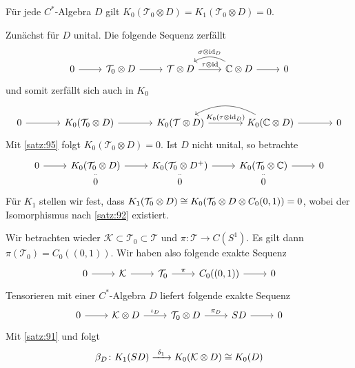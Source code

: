 \begin{korollar}[label=korr:96]
	Für jede $C^*$-Algebra $D$ gilt $K_0(\mathcal{T}_0 \otimes D) = K_1(\mathcal{T}_0 \otimes D) = 0$.
\end{korollar}
\begin{beweis}
	Zunächst für $D$ unital.
	Die folgende Sequenz zerfällt
	\[
		\begin{tikzcd}
			0 \rar & \mathcal{T}_0 \otimes D \rar & \mathcal{T} \otimes D \rar["\tau \otimes {\id}"] & \mathbb{C} \otimes D \rar \lar[bend right,"\sigma \otimes {\id_D}"'] & 0
		\end{tikzcd}
	\]
	und somit zerfällt sich auch in $K_0$
	\[
		\begin{tikzcd}[sep=large]
			0 \rar & K_0(\mathcal{T}_0 \otimes D) \rar & K_0(\mathcal{T} \otimes D) \rar["K_0(\tau \otimes {\id_D})"] & K_0(\mathbb{C} \otimes D) \lar[bend right] \rar & 0
		\end{tikzcd}
	\]
	Mit \autoref{satz:95} folgt $K_0(\mathcal{T}_0 \otimes D)=0$.
	Ist $D$ nicht unital, so betrachte
	\[
		\begin{tikzcd}[row sep=small]
			0 \rar & K_0(\mathcal{T}_0 \otimes D) \rar & K_0 \enbrace*{\mathcal{T}_0 \otimes D^+} \rar & K_0(\mathcal{T}_0 \otimes \mathbb{C}) \rar & 0 \\[-.8em]
			& 0 \uar[equal] & \uar[equal]0  & \uar[equal] 0
		\end{tikzcd}
	\]
	Für $K_1$ stellen wir fest, dass $K_1(\mathcal{T}_0 \otimes D) \cong K_0 \enbrace*{\mathcal{T}_0 \otimes D \otimes C_0(0,1)} = 0$, wobei der Isomorphismus nach \autoref{satz:92} existiert.
\end{beweis}

Wir betrachten wieder $\mathcal{K} \subset \mathcal{T}_0 \subset \mathcal{T}$ und $\pi \colon \mathcal{T} \to C(S^1)$. 
Es gilt dann $\pi(\mathcal{T}_0) = C_0((0,1))$.
Wir haben also folgende exakte Sequenz
\[
	\begin{tikzcd}
		0 \rar & \mathcal{K} \rar & \mathcal{T}_0 \rar["\pi"] & C_0 \enbrace*{(0,1)} \rar & 0
	\end{tikzcd}
\]
Tensorieren mit einer $C^*$-Algebra $D$ liefert folgende exakte Sequenz
\[
	\begin{tikzcd}
		0 \rar & \mathcal{K} \otimes D \rar["\iota_D"] & \mathcal{T}_0 \otimes D \rar["\pi_D"] & SD \rar & 0
	\end{tikzcd}
\]
Mit \autoref{satz:91} und  folgt
\[
	\beta_D \colon K_1(SD) \grenzw{\delta_1} K_0 \enbrace*{\mathcal{K} \otimes D} \cong K_0(D)
\]

